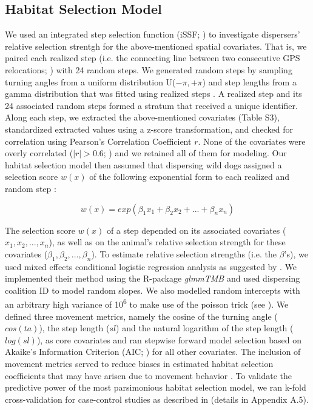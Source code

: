 \documentclass[abstract=on,10pt,a4paper,bibliography=totocnumbered]{article}
\begin{document}
\subsection{Habitat Selection Model}
We used an integrated step selection function (iSSF; \citealp{Avgar.2016}) to
investigate dispersers' relative selection strentgh  for the
above-mentioned spatial covariates. That is, we paired each realized step (i.e.
the connecting line between two consecutive GPS relocations;
\citealp{Turchin.1998}) with 24 random steps. We generated random steps by
sampling turning angles from a uniform distribution U(\(-\pi, +\pi\)) and step
lengths from a gamma distribution that was fitted using realized steps
\citep{Avgar.2016}. A realized step and its 24 associated random steps formed a
stratum that received a unique identifier. Along each step, we extracted the
above-mentioned covariates (Table S3), standardized extracted values using a
z-score transformation, and checked for correlation using Pearson's Correlation
Coefficient \(r\). None of the covariates were overly correlated (\(|r| > 0.6\);
\citealp{Latham.2011}) and we retained all of them for modeling. Our habitat
selection model then assumed that dispersing wild dogs assigned a selection
score \(w(x)\) of the following exponential form to each realized and random
step \citep{Fortin.2005}:

\begin{equation}
\label{EQ1}
  w(x) = exp(\beta_1 x_1 + \beta_2 x_2 + ... + \beta_n x_n)
\end{equation}

\noindent The selection score \(w(x)\) of a step depended on its associated
covariates (\(x_1, x_2, ..., x_n\)), as well as on the animal's relative
selection strength  for these covariates (\(\beta_1,
\beta_2, ..., \beta_n\)). To estimate relative selection strengths  (i.e. the \(\beta\)'s), we used mixed effects conditional logistic
regression analysis as suggested by \cite{Muff.2020}. We implemented their
method using the R-package \textit{glmmTMB} \citep{Mollie.2017} and used
dispersing coalition ID to model random slopes. We also modelled random
intercepts with an arbitrary high variance of 10\textsuperscript{6} to make use
of the poisson trick (see \citealp{Muff.2020}). We defined three movement
metrics, namely the cosine of the turning angle (\(cos(ta)\)), the step length
(\(sl\)) and the natural logarithm of the step length (\(log(sl)\)), as core
covariates and ran stepwise forward model selection based on Akaike's
Information Criterion (AIC; \citealp{Burnham.2002}) for all other
covariates. The inclusion of movement metrics
served to reduce biases in estimated habitat selection coefficients  that may have arisen due to movement behavior \citep{Avgar.2016}.
To validate the predictive power of the most parsimonious habitat selection
model, we ran k-fold cross-validation for case-control studies as described in
\cite{Fortin.2009} (details in Appendix A.5).
\end{document}

